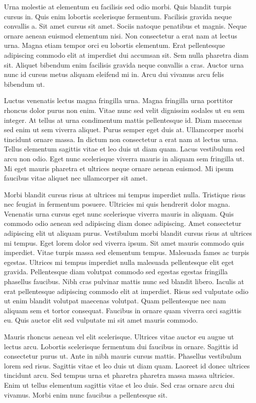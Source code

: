 \documentclass[portuguese, 11pt, a4paper, titlepage, oneside]{article}
\begin{document}
Urna molestie at elementum eu facilisis sed odio morbi. Quis blandit turpis cursus in. Quis enim lobortis scelerisque fermentum. Facilisis gravida neque convallis a. Sit amet cursus sit amet. Sociis natoque penatibus et magnis. Neque ornare aenean euismod elementum nisi. Non consectetur a erat nam at lectus urna. Magna etiam tempor orci eu lobortis elementum. Erat pellentesque adipiscing commodo elit at imperdiet dui accumsan sit. Sem nulla pharetra diam sit. Aliquet bibendum enim facilisis gravida neque convallis a cras. Auctor urna nunc id cursus metus aliquam eleifend mi in. Arcu dui vivamus arcu felis bibendum ut.

Luctus venenatis lectus magna fringilla urna. Magna fringilla urna porttitor rhoncus dolor purus non enim. Vitae nunc sed velit dignissim sodales ut eu sem integer. At tellus at urna condimentum mattis pellentesque id. Diam maecenas sed enim ut sem viverra aliquet. Purus semper eget duis at. Ullamcorper morbi tincidunt ornare massa. In dictum non consectetur a erat nam at lectus urna. Tellus elementum sagittis vitae et leo duis ut diam quam. Lacus vestibulum sed arcu non odio. Eget nunc scelerisque viverra mauris in aliquam sem fringilla ut. Mi eget mauris pharetra et ultrices neque ornare aenean euismod. Mi ipsum faucibus vitae aliquet nec ullamcorper sit amet.

Morbi blandit cursus risus at ultrices mi tempus imperdiet nulla. Tristique risus nec feugiat in fermentum posuere. Ultricies mi quis hendrerit dolor magna. Venenatis urna cursus eget nunc scelerisque viverra mauris in aliquam. Quis commodo odio aenean sed adipiscing diam donec adipiscing. Amet consectetur adipiscing elit ut aliquam purus. Vestibulum morbi blandit cursus risus at ultrices mi tempus. Eget lorem dolor sed viverra ipsum. Sit amet mauris commodo quis imperdiet. Vitae turpis massa sed elementum tempus. Malesuada fames ac turpis egestas. Ultrices mi tempus imperdiet nulla malesuada pellentesque elit eget gravida. Pellentesque diam volutpat commodo sed egestas egestas fringilla phasellus faucibus. Nibh cras pulvinar mattis nunc sed blandit libero. Iaculis at erat pellentesque adipiscing commodo elit at imperdiet. Risus sed vulputate odio ut enim blandit volutpat maecenas volutpat. Quam pellentesque nec nam aliquam sem et tortor consequat. Faucibus in ornare quam viverra orci sagittis eu. Quis auctor elit sed vulputate mi sit amet mauris commodo.

Mauris rhoncus aenean vel elit scelerisque. Ultrices vitae auctor eu augue ut lectus arcu. Lobortis scelerisque fermentum dui faucibus in ornare. Sagittis id consectetur purus ut. Ante in nibh mauris cursus mattis. Phasellus vestibulum lorem sed risus. Sagittis vitae et leo duis ut diam quam. Laoreet id donec ultrices tincidunt arcu. Sed tempus urna et pharetra pharetra massa massa ultricies. Enim ut tellus elementum sagittis vitae et leo duis. Sed cras ornare arcu dui vivamus. Morbi enim nunc faucibus a pellentesque sit.
\end{document}
